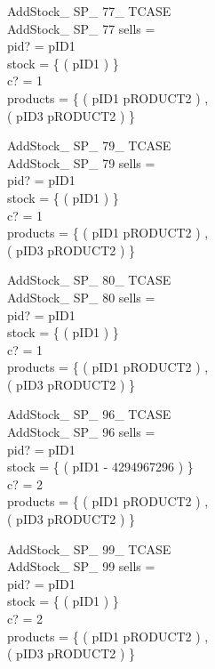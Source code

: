 \begin{schema}{AddStock\_ SP\_ 77\_ TCASE}\\
AddStock\_ SP\_ 77
\where
sells =~\emptyset \\
pid? = pID1 \\
stock = \{ ( pID1  ) \} \\
c? = 1 \\
products = \{ ( pID1 \mapsto pRODUCT2 ) , \\ ( pID3 \mapsto pRODUCT2 ) \}
\end{schema}


\begin{schema}{AddStock\_ SP\_ 79\_ TCASE}\\
AddStock\_ SP\_ 79
\where
sells =~\emptyset \\
pid? = pID1 \\
stock = \{ ( pID1  ) \} \\
c? = 1 \\
products = \{ ( pID1 \mapsto pRODUCT2 ) , \\ ( pID3 \mapsto pRODUCT2 ) \}
\end{schema}


\begin{schema}{AddStock\_ SP\_ 80\_ TCASE}\\
AddStock\_ SP\_ 80
\where
sells =~\emptyset \\
pid? = pID1 \\
stock = \{ ( pID1  ) \} \\
c? = 1 \\
products = \{ ( pID1 \mapsto pRODUCT2 ) , \\ ( pID3 \mapsto pRODUCT2 ) \}
\end{schema}


\begin{schema}{AddStock\_ SP\_ 96\_ TCASE}\\
AddStock\_ SP\_ 96
\where
sells =~\emptyset \\
pid? = pID1 \\
stock = \{ ( pID1 \mapsto - 4294967296 ) \} \\
c? = 2 \\
products = \{ ( pID1 \mapsto pRODUCT2 ) , \\ ( pID3 \mapsto pRODUCT2 ) \}
\end{schema}


\begin{schema}{AddStock\_ SP\_ 99\_ TCASE}\\
AddStock\_ SP\_ 99
\where
sells =~\emptyset \\
pid? = pID1 \\
stock = \{ ( pID1  ) \} \\
c? = 2 \\
products = \{ ( pID1 \mapsto pRODUCT2 ) , \\  ( pID3 \mapsto pRODUCT2 ) \}
\end{schema}


